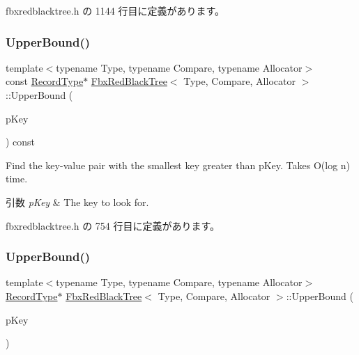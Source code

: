  fbxredblacktree.\+h の 1144 行目に定義があります。

\mbox{\label{class_fbx_red_black_tree_a42a816012df609184b4cef2889ac868a}} 
\subsubsection{\texorpdfstring{Upper\+Bound()}{UpperBound()}\hspace{0.1cm}{\footnotesize\ttfamily [1/2]}}
{\footnotesize\ttfamily template$<$typename Type, typename Compare, typename Allocator$>$ \\
const \hyperlink{class_fbx_red_black_tree_1_1_record_type}{Record\+Type}$\ast$ \hyperlink{class_fbx_red_black_tree}{Fbx\+Red\+Black\+Tree}$<$ Type, Compare, Allocator $>$\+::Upper\+Bound (\begin{DoxyParamCaption}\item[{const \hyperlink{class_fbx_red_black_tree_a241b31c6972995417d193458b7bb27e2}{Key\+Type} \&}]{p\+Key }\end{DoxyParamCaption}) const\hspace{0.3cm}{\ttfamily [inline]}}

Find the key-\/value pair with the smallest key greater than p\+Key. Takes O(log n) time. 
\begin{DoxyParams}{引数}
{\em p\+Key} & The key to look for. \\
\hline
\end{DoxyParams}


 fbxredblacktree.\+h の 754 行目に定義があります。

\mbox{\label{class_fbx_red_black_tree_a90138895586387a60eb91306888a2ab6}} 
\subsubsection{\texorpdfstring{Upper\+Bound()}{UpperBound()}\hspace{0.1cm}{\footnotesize\ttfamily [2/2]}}
{\footnotesize\ttfamily template$<$typename Type, typename Compare, typename Allocator$>$ \\
\hyperlink{class_fbx_red_black_tree_1_1_record_type}{Record\+Type}$\ast$ \hyperlink{class_fbx_red_black_tree}{Fbx\+Red\+Black\+Tree}$<$ Type, Compare, Allocator $>$\+::Upper\+Bound (\begin{DoxyParamCaption}\item[{const \hyperlink{class_fbx_red_black_tree_a241b31c6972995417d193458b7bb27e2}{Key\+Type} \&}]{p\+Key }\end{DoxyParamCaption})\hspace{0.3cm}{\ttfamily [inline]}}

